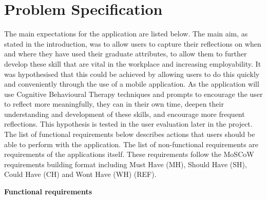 \documentclass{l4proj}
\begin{document}
\section{Problem Specification}

The main expectations for the application are listed below. The main aim, as stated in the introduction, was to allow users to capture 
their reflections on when and where they have used their graduate attributes, to allow them to further develop these skill that 
are vital in the workplace and increasing employability. It was hypothesised that this could be achieved by allowing users to do this
quickly and conveniently through the use of a mobile application. As the application will use Cognitive Behavioural Therapy 
techniques and prompts to encourage the user to reflect more meaningfully, they can in their own time, deepen their understanding  and
development of these skills, and encourage more frequent reflections. This hypothesis is tested in the user evaluation later in the 
project. The list of functional requirements below describes actions that users should be able to perform with the application. 
The list of non-functional requirements are requirements of the applications itself.
These requirements follow the MoSCoW requirements building format including Must Have (MH), Should Have (SH), Could Have (CH) and Wont
Have (WH) (REF).
\par 
\textbf{Functional requirements}
\end{document}
